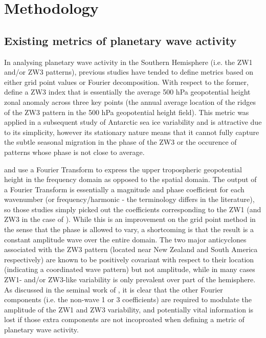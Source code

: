 \section{Methodology}\label{s:methodology}

\subsection{Existing metrics of planetary wave activity}\label{s:existing_metrics}

In analysing planetary wave activity in the Southern Hemisphere (i.e. the ZW1 and/or ZW3 patterns), previous studies have tended to define metrics based on either grid point values or Fourier decomposition. With respect to the former, \citet{Raphael2004} define a ZW3 index that is essentially the average 500 hPa geopotential height zonal anomaly across three key points (the annual average location of the ridges of the ZW3 pattern in the 500 hPa geopotential height field). This metric was applied in a subsequent study of Antarctic sea ice variability \citep{Raphael2007} and is attractive due to its simplicity, however its stationary nature means that it cannot fully capture the subtle \citep[but not insignificant at around 15 degrees of longitude on average;][]{vanLoon1984,Mo1985} seasonal migration in the phase of the ZW3 or the occurence of patterns whose phase is not close to average.

\citet{Hobbs2007} and \citet{Hobbs2010} use a Fourier Transform to express the upper tropospheric geopotential height in the frequency domain as opposed to the spatial domain. The output of a Fourier Transform is essentially a magnitude and phase coefficient for each wavenumber (or frequency/harmonic - the terminology differs in the literature), so those studies simply picked out the coefficients corresponding to the ZW1 (and ZW3 in the case of \citet{Hobbs2010}). While this is an improvement on the grid point method in the sense that the phase is allowed to vary, a shortcoming is that the result is a constant amplitude wave over the entire domain. The two major anticyclones associated with the ZW3 pattern (located near New Zealand and South America respectively) are known \citet{Hobbs2010} to be positively covariant with respect to their location (indicating a coordinated wave pattern) but not amplitude, while in many cases ZW1- and/or ZW3-like variability is only prevalent over part of the hemisphere. As discussed in the seminal work of \citet{vanLoon1972}, it is clear that the other Fourier components (i.e. the non-wave 1 or 3 coefficients) are required to modulate the amplitude of the ZW1 and ZW3 variability, and potentially vital information is lost if those extra components are not incoproated when defining a metric of planetary wave activity. 

